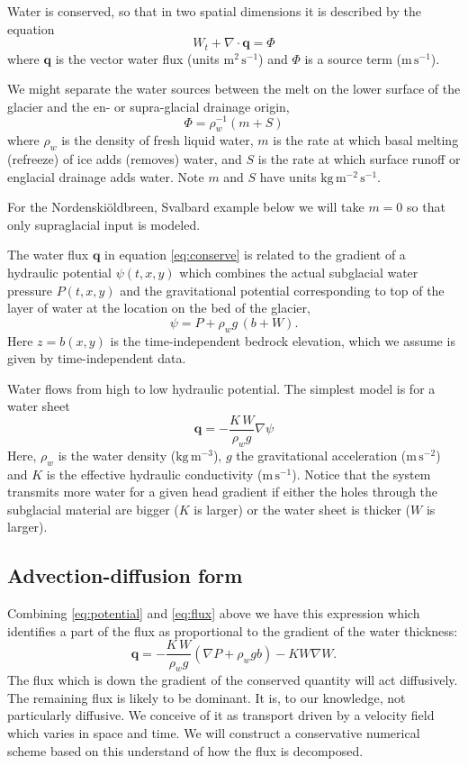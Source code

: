 \documentclass[12pt,final]{amsart}%
\newcommand\bq{\mathbf{q}}
\newcommand{\Div}{\nabla\cdot}
\newcommand{\grad}{\nabla}
\begin{document}
Water is conserved, so that in two spatial dimensions it is described by the equation \citep{Clarke05}
\begin{equation} \label{eq:conserve}
W_t + \Div \bq = \Phi
\end{equation}
where $\bq$ is the vector water flux (units $\text{m}^2\,\text{s}^{-1}$) and $\Phi$ is a source term ($\text{m}\,\text{s}^{-1}$).

We might separate the water sources between the melt on the lower surface of the glacier and the en- or supra-glacial drainage origin,
  $$\Phi = \rho_w^{-1} \left(m + S\right)$$
where $\rho_w$ is the density of fresh liquid water, $m$ is the rate at which basal melting (refreeze) of ice adds (removes) water, and $S$ is the rate at which surface runoff or englacial drainage adds water.  Note $m$ and $S$ have units $\text{kg}\,\text{m}^{-2}\,\text{s}^{-1}$.

\newcommand{\Nbreen}{Nordenski\"oldbreen\xspace}
For the \Nbreen, Svalbard example below we will take $m=0$ so that only supraglacial input is modeled.

The water flux $\bq$ in equation \eqref{eq:conserve} is related to the gradient of a hydraulic potential $\psi(t,x,y)$ which combines the actual subglacial water pressure $P(t,x,y)$ and the gravitational potential corresponding to top of the layer of water at the location on the bed of the glacier,
\begin{equation} \label{eq:potential}
\psi = P + \rho_w g\, (b+W).
\end{equation}
Here $z=b(x,y)$ is the time-independent bedrock elevation, which we assume is given by time-independent data.

Water flows from high to low hydraulic potential.  The simplest model is for a water sheet \citep{Clarke05}
\begin{equation}  \label{eq:flux}
\bq = - \frac{K \, W}{\rho_w g} \grad \psi
\end{equation}
Here, $\rho_w$ is the water density ($\text{kg}\,\text{m}^{-3}$), $g$ the gravitational acceleration ($\text{m}\,\text{s}^{-2}$) and $K$ is the effective hydraulic conductivity ($\text{m}\,\text{s}^{-1}$).  Notice that the system transmits more water for a given head gradient if either the holes through the subglacial material are bigger ($K$ is larger) or the water sheet is thicker ($W$ is larger).

\subsection*{Advection-diffusion form}  Combining \eqref{eq:potential} and \eqref{eq:flux} above we have this expression which identifies a part of the flux as proportional to the gradient of the water thickness:
	$$\bq = - \frac{K\, W}{\rho_w g} \left(\grad P + \rho_w g b\right) - K W \grad W.$$
The flux which is down the gradient of the conserved quantity will act diffusively.  The remaining flux is likely to be dominant.  It is, to our knowledge, not particularly diffusive.  We conceive of it as transport driven by a velocity field which varies in space and time.  We will construct a conservative numerical scheme based on this understand of how the flux is decomposed.
\end{document}
